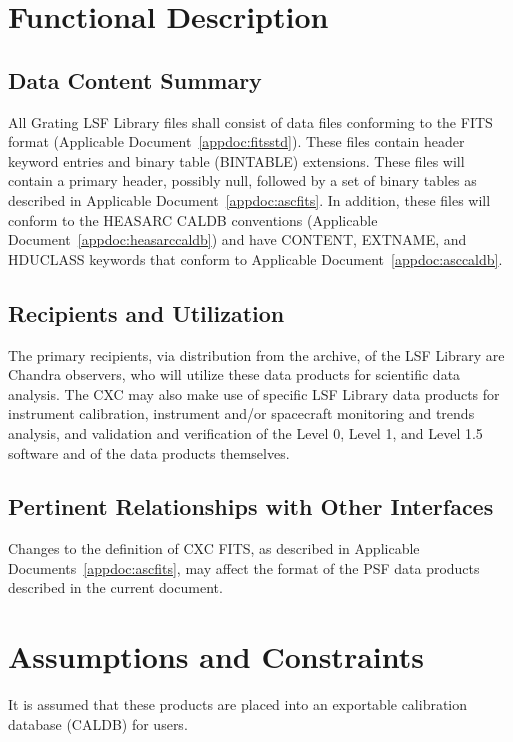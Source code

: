 \documentclass[twoside]{article}
\begin{document}
\section{Functional Description}

\subsection{Data Content Summary}

All Grating LSF Library files shall
consist of data files conforming to the FITS format (Applicable
Document~\ref{appdoc:fitsstd}). These files
contain header keyword entries and binary table (BINTABLE) extensions.
These files will contain a primary header, possibly null, followed
by a set of binary tables as described in Applicable
Document~\ref{appdoc:ascfits}. In addition, these files will conform to the
HEASARC CALDB conventions (Applicable Document~\ref{appdoc:heasarccaldb}) and
have CONTENT, EXTNAME, and HDUCLASS keywords that conform to
Applicable Document~\ref{appdoc:asccaldb}.


\subsection{Recipients and Utilization}

The primary recipients, via distribution from the archive, of the LSF
Library are Chandra observers, who will utilize these data products for
scientific data analysis. The CXC may also make use of specific LSF
Library data products for instrument calibration, instrument and/or
spacecraft monitoring and trends analysis, and validation and
verification of the Level 0, Level 1, and Level 1.5 software and of
the data products themselves.

\subsection{Pertinent Relationships with Other Interfaces}

Changes to the definition of CXC FITS, as described in Applicable
Documents~\ref{appdoc:ascfits}, may affect the format of the PSF data
products described in the current document.

\section{Assumptions and Constraints}

It is assumed that these products are placed into an exportable calibration database
(CALDB) for users.
\end{document}
